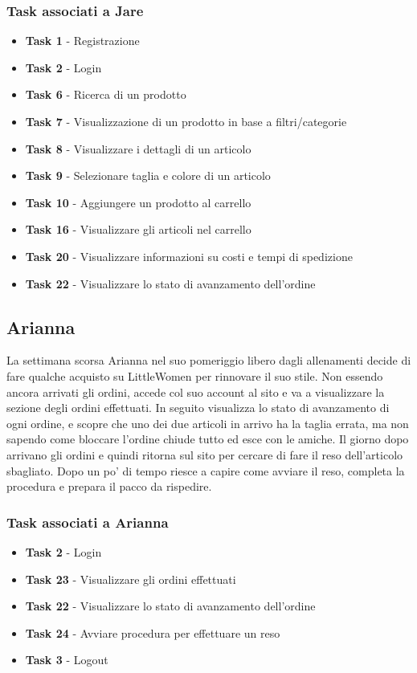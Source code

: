 \documentclass[12pt,a4paper]{report}
\begin{document}
\subsubsection*{Task associati a Jare}
\begin{itemize}
\item \textbf{Task 1} - Registrazione
\item \textbf{Task 2} - Login
\item \textbf{Task 6} - Ricerca di un prodotto
\item \textbf{Task 7} - Visualizzazione di un prodotto in base a filtri/categorie
\item \textbf{Task 8} - Visualizzare i dettagli di un articolo
\item \textbf{Task 9} - Selezionare taglia e colore di un articolo
\item \textbf{Task 10} - Aggiungere un prodotto al carrello
\item \textbf{Task 16} - Visualizzare gli articoli nel carrello
\item \textbf{Task 20} - Visualizzare informazioni su costi e tempi di spedizione
\item \textbf{Task 22} - Visualizzare lo stato di avanzamento dell'ordine
\end{itemize}

\subsection*{Arianna}
La settimana scorsa Arianna nel suo pomeriggio libero dagli allenamenti decide di fare qualche acquisto su LittleWomen per rinnovare il suo stile. Non essendo ancora arrivati gli ordini, accede col suo account al sito e va a visualizzare la sezione degli ordini effettuati. In seguito visualizza lo stato di avanzamento di ogni ordine, e scopre che uno dei due articoli in arrivo ha la taglia errata, ma non sapendo come bloccare l'ordine chiude tutto ed esce con le amiche.
Il giorno dopo arrivano gli ordini e quindi ritorna sul sito per cercare di fare il reso dell'articolo sbagliato. Dopo un po' di tempo riesce a capire come avviare il reso, completa la procedura e prepara il pacco da rispedire.
\subsubsection*{Task associati a Arianna}
\begin{itemize}
\item \textbf{Task 2} - Login
\item \textbf{Task 23} - Visualizzare gli ordini effettuati
\item \textbf{Task 22} - Visualizzare lo stato di avanzamento dell'ordine
\item \textbf{Task 24} - Avviare procedura per effettuare un reso
\item \textbf{Task 3} - Logout
\end{itemize}
\end{document}
